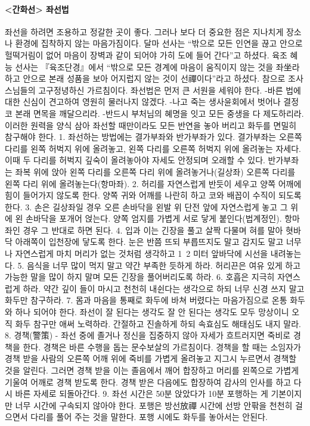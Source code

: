 \documentclass[12pt, a4paper, oneside]{book}
\begin{document}
\paragraph{<간화선> 좌선법 }
좌선을 하려면 조용하고 정갈한 곳이 좋다. 그러나 보다 더 중요한 점은 지나치게 장소나 환경에 집착하지 않는 마음가짐이다. 달마 선사는 “밖으로 모든 인연을 끊고 안으로 헐떡거림이 없어 마음이 장벽과 같이 되어야 가히 도에 들어 간다”고 하셨다. 육조 혜능 선사는 『육조단경』에서 “밖으로 모든 경계에 마음이 움직이지 않는 것을 좌坐라 하고 안으로 본래 성품을 보아 어지럽지 않는 것이 선禪이다”라고 하셨다. 참으로 조사스님들의 고구정녕하신 가르침이다. 
좌선법은 먼저 큰 서원을 세워야 한다. 
-바른 법에 대한 신심이 견고하여 영원히 물러나지 않겠다. 
-나고 죽는 생사윤회에서 벗어나 결정코 본래 면목을 깨달으리라. 
-반드시 부처님의 혜명을 잇고 모든 중생을 다 제도하리라. 
이러한 원력을 양식 삼아 좌선할 때만이라도 모든 반연을 놓아 버리고 화두를 면밀히 참구해야 한다.
1. 좌선하는 방법에는 결가부좌와 반가부좌가 있다. 결가부좌는 오른쪽 다리를 왼쪽 허벅지 위에 올려놓고, 왼쪽 다리를 오른쪽 허벅지 위에 올려놓는 자세다. 이때 두 다리를 허벅지 깊숙이 올려놓아야 자세도 안정되며 오래할 수 있다. 반가부좌는 좌복 위에 앉아 왼쪽 다리를 오른쪽 다리 위에 올려놓거나(길상좌) 오른쪽 다리를 왼쪽 다리 위에 올려놓는다(항마좌).  
2. 허리를 자연스럽게 반듯이 세우고 양쪽 어깨에 힘이 들어가지 않도록 한다. 양쪽 귀와 어깨를 나란히 하고 코와 배꼽이 수직이 되도록 한다.   
3. 손은 길상좌일 경우 오른 손바닥을 왼발 위 단전 앞에 자연스럽게 놓고 그 위에 왼 손바닥을 포개어 얹는다. 양쪽 엄지를 가볍게 서로 닿게 붙인다(법계정인). 항마좌인 경우 그 반대로 하면 된다.   
4. 입과 이는 긴장을 풀고 살짝 다물며 혀를 말아 혓바닥 아래쪽이 입천장에 닿도록 한다. 눈은 반쯤 뜨되 부릅뜨지도 말고 감지도 말고 너무나 자연스럽게 마치 머리가 없는 것처럼 생각하고 1~2 미터 앞바닥에 시선을 내려놓는다.  
5. 음식을 너무 많이 먹지 말고 약간 부족한 듯하게 하라. 허리끈은 여유 있게 하고 가능한 말을 많이 하지 말며 모든 긴장을 풀어버리도록 하라.  
6. 호흡은 지극히 자연스럽게 하라. 약간 깊이 들이 마시고 천천히 내쉰다는 생각으로 하되 너무 신경 쓰지 말고 화두만 참구하라.  
7. 몸과 마음을 통째로 화두에 바쳐 버렸다는 마음가짐으로 온통 화두와 하나 되어야 한다. 좌선이 잘 된다는 생각도 잘 안 된다는 생각도 모두 망상이니 오직 화두 참구만 애써 노력하라. 간절하고 진솔하게 하되 속효심도 해태심도 내지 말라.  
8. 경책(警策) - 좌선 중에 졸거나 정신을 집중하지 않아 자세가 흐트러지면 죽비로 경책을 한다. 경책은 바른 수행을 돕는 문수보살의 가르침이다. 경책을 할 때는 소임자가 경책 받을 사람의 오른쪽 어깨 위에 죽비를 가볍게 올려놓고 지그시 누르면서 경책할 것을 알린다. 그러면 경책 받을 이는 졸음에서 깨어 합장하고 머리를 왼쪽으로 가볍게 기울여 어깨로 경책 받도록 한다. 경책 받은 다음에도 합장하여 감사의 인사를 하고 다시 바른 자세로 되돌아간다.  
9. 좌선 시간은 50분 앉았다가 10분 포행하는 게 기본이지만 너무 시간에 구속되지 않아야 한다. 포행은 방선放禪 시간에 선방 안팎을 천천히 걸으면서 다리를 풀어 주는 것을 말한다. 포행 시에도 화두를 놓아서는 안된다.  
 
\end{document}
